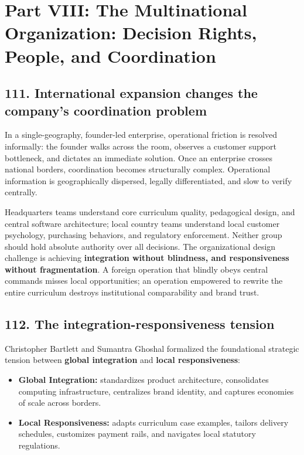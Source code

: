 \section{Part VIII: The Multinational Organization: Decision Rights, People, and Coordination}

\subsection{111. International expansion changes the company's coordination problem}

In a single-geography, founder-led enterprise, operational friction is resolved informally: the founder walks across the room, observes a customer support bottleneck, and dictates an immediate solution. Once an enterprise crosses national borders, coordination becomes structurally complex. Operational information is geographically dispersed, legally differentiated, and slow to verify centrally.

Headquarters teams understand core curriculum quality, pedagogical design, and central software architecture; local country teams understand local customer psychology, purchasing behaviors, and regulatory enforcement. Neither group should hold absolute authority over all decisions. The organizational design challenge is achieving \textbf{integration without blindness, and responsiveness without fragmentation}. A foreign operation that blindly obeys central commands misses local opportunities; an operation empowered to rewrite the entire curriculum destroys institutional comparability and brand trust.

\subsection{112. The integration-responsiveness tension}

Christopher Bartlett and Sumantra Ghoshal formalized the foundational strategic tension between \textbf{global integration} and \textbf{local responsiveness}:
\begin{itemize}
    \item \textbf{Global Integration:} standardizes product architecture, consolidates computing infrastructure, centralizes brand identity, and captures economies of scale across borders.
    \item \textbf{Local Responsiveness:} adapts curriculum case examples, tailors delivery schedules, customizes payment rails, and navigates local statutory regulations.
\end{itemize}

